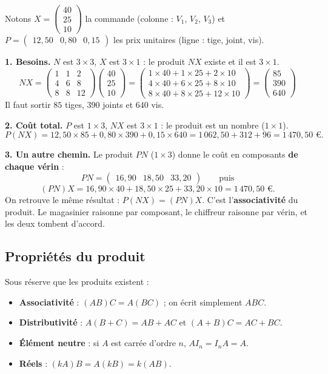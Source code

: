 \documentclass[a4paper,11pt]{article}
\newcommand{\M}[1]{\begin{pmatrix}#1\end{pmatrix}}
\begin{document}
\begin{appliindus}\label{ex:besoins}
Notons $X = \M{40\\25\\10}$ la commande (colonne : $V_1$, $V_2$, $V_3$) et $P = \M{12{,}50 & 0{,}80 & 0{,}15}$ les prix unitaires (ligne : tige, joint, vis).

\textbf{1. Besoins.} $N$ est $3\times 3$, $X$ est $3\times 1$ : le produit $NX$ existe et il est $3\times 1$.
\[
NX = \M{1 & 1 & 2\\ 4 & 6 & 8\\ 8 & 8 & 12}\M{40\\25\\10}
= \M{1\times 40 + 1\times 25 + 2\times 10\\ 4\times 40 + 6\times 25 + 8\times 10\\ 8\times 40 + 8\times 25 + 12\times 10}
= \M{85\\390\\640}
\]
Il faut sortir $85$ tiges, $390$ joints et $640$ vis.

\textbf{2. Coût total.} $P$ est $1\times 3$, $NX$ est $3\times 1$ : le produit est un nombre ($1\times 1$).
\[
P(NX) = 12{,}50\times 85 + 0{,}80\times 390 + 0{,}15\times 640 = 1\,062{,}50 + 312 + 96 = 1\,470{,}50 \text{ €.}
\]

\textbf{3. Un autre chemin.} Le produit $PN$ ($1\times 3$) donne le coût en composants \textbf{de chaque vérin} :
\[
PN = \M{16{,}90 & 18{,}50 & 33{,}20}
\qquad\text{puis}\]
\[(PN)X = 16{,}90\times 40 + 18{,}50\times 25 + 33{,}20\times 10 = 1\,470{,}50 \text{ €.}
\]
On retrouve le même résultat : $P(NX) = (PN)X$. C'est l'\textbf{associativité} du produit. Le magasinier raisonne par composant, le chiffreur raisonne par vérin, et les deux tombent d'accord.
\end{appliindus}

\subsection{Propriétés du produit}\label{subsec:proprietes}

\begin{theoreme}
Sous réserve que les produits existent :
\begin{itemize}
  \item \textbf{Associativité} : $(AB)C = A(BC)$ ; on écrit simplement $ABC$.
  \item \textbf{Distributivité} : $A(B+C) = AB + AC$ et $(A+B)C = AC + BC$.
  \item \textbf{Élément neutre} : si $A$ est carrée d'ordre $n$, $AI_n = I_nA = A$.
  \item \textbf{Réels} : $(kA)B = A(kB) = k(AB)$.
\end{itemize}
\end{theoreme}
\end{document}
